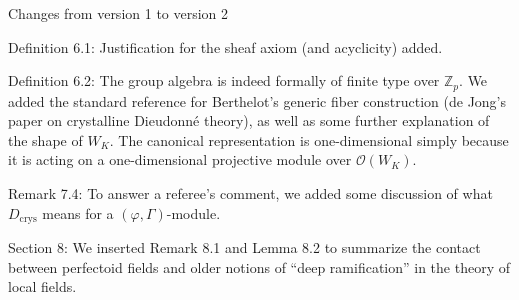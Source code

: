 \documentclass[12pt]{amsart}
\begin{document}
\begin{center}
Changes from version 1 to version 2
\end{center}

Definition 6.1: Justification for the sheaf axiom (and acyclicity) added.

Definition 6.2: The group algebra is indeed formally of finite type over $\mathbb{Z}_p$. We added the standard reference for Berthelot's generic fiber construction (de Jong's paper on crystalline Dieudonn\'e theory), as well as some further explanation of the shape of $W_K$. The canonical representation is one-dimensional simply because it is acting on a one-dimensional projective module over $\mathcal{O}(W_K)$.

Remark 7.4: To answer a referee's comment, we added some discussion of what $D_{\mathrm{crys}}$ means for a $(\varphi, \Gamma)$-module.

Section 8: We inserted Remark 8.1 and Lemma 8.2 to summarize the contact between perfectoid fields and older notions of ``deep ramification'' in the theory of local fields.
\end{document}
